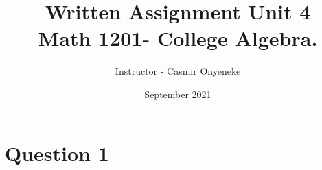 \documentclass{article}
\title{Written Assignment Unit 4\\
Math 1201- College Algebra.
}
\author{Instructor - Casmir Onyeneke}
\date{September 2021}
\begin{document}
\maketitle

\section*{Question 1}
\end{document}
